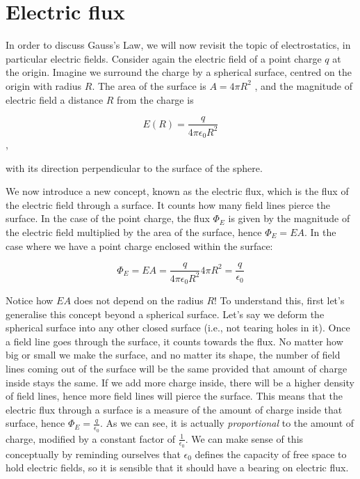 \documentclass[
  letterpaper,
  DIV=11,
  numbers=noendperiod]{scrreprt}
\begin{document}
\section{Electric flux}\label{electric-flux}

In order to discuss Gauss's Law, we will now revisit the topic of
electrostatics, in particular electric fields. Consider again the
electric field of a point charge \(q\) at the origin. Imagine we
surround the charge by a spherical surface, centred on the origin with
radius \(R\). The area of the surface is \(A = 4\pi R^2\) , and the
magnitude of electric field a distance \(R\) from the charge is

\[ E(R) = \frac{q}{4\pi \epsilon_0 R^2} \],

with its direction perpendicular to the surface of the sphere.

We now introduce a new concept, known as the electric flux, which is the
flux of the electric field through a surface. It counts how many field
lines pierce the surface. In the case of the point charge, the flux
\(\Phi_E\) is given by the magnitude of the electric field multiplied by
the area of the surface, hence \(\Phi_E = EA\). In the case where we
have a point charge enclosed within the surface:

\[ \Phi_E = EA = \frac{q}{4\pi\epsilon_0 R^2} 4\pi R^2 = \frac{q}{\epsilon_0} \]

Notice how \(EA\) does not depend on the radius \(R\)! To understand
this, first let's generalise this concept beyond a spherical surface.
Let's say we deform the spherical surface into any other closed surface
(i.e., not tearing holes in it). Once a field line goes through the
surface, it counts towards the flux. No matter how big or small we make
the surface, and no matter its shape, the number of field lines coming
out of the surface will be the same provided that amount of charge
inside stays the same. If we add more charge inside, there will be a
higher density of field lines, hence more field lines will pierce the
surface. This means that the electric flux through a surface is a
measure of the amount of charge inside that surface, hence
\(\Phi_E = \frac{q}{\epsilon_0}\). As we can see, it is actually
\emph{proportional} to the amount of charge, modified by a constant
factor of \(\frac{1}{\epsilon_0}\). We can make sense of this
conceptually by reminding ourselves that \(\epsilon_0\) defines the
capacity of free space to hold electric fields, so it is sensible that
it should have a bearing on electric flux.
\end{document}
